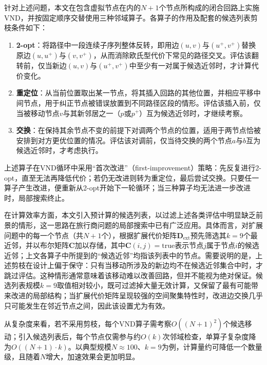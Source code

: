 \documentclass[lettersize,journal]{IEEEtran}
\begin{document}
针对上述问题，本文在包含虚拟节点在内的$N+1$个节点所构成的闭合回路上实施VND，并按固定顺序交替使用三种邻域算子。各算子的作用及配套的候选列表剪枝条件如下：
\begin{enumerate}
\item \textbf{2-opt}：将路径中一段连续子序列整体反转，即用边$(u, v)$与$(u^{+}, v^{+})$替换原边$(u, u^{+})$与$(v, v^{+})$，从而消除欧氏型代价下常见的路径交叉。评估该翻转前，仅当新边$(u, v)$与$(u^{+}, v^{+})$中至少有一对属于候选近邻时，才计算代价变化。
\item \textbf{重定位}：从当前位置取出某一节点，将其插入回路的其他位置，并相应平移中间节点，用于纠正节点被错误放置到不同路径区段的情形。评估该插入前，仅当被移动节点$v$与其新邻居之一（$p$或$p^{+}$）互为候选近邻时，才继续考察。
\item \textbf{交换}：在保持其余节点不变的前提下对调两个节点的位置，适用于两节点恰被安排到对方更优位置的情况。评估该对调前，仅当待交换的两个节点$a$与$b$互为候选近邻时，才考虑执行。
\end{enumerate}
上述算子在VND循环中采用“首次改进”（first-improvement）策略：先反复进行2-opt，直至无法再降低代价；若仍无改进则转为重定位，最后尝试交换。只要任一算子产生改进，便重新从2-opt开始下一轮循环；当三种算子均无法进一步改进时，局部搜索终止。

在计算效率方面，本文引入预计算的候选列表，以过滤上述各类评估中明显缺乏前景的情形，这一思路在旅行商问题的局部搜索中已有广泛应用\cite{ref26}。具体而言，对扩展问题中的每一个节点（共$N+1$个），根据扩展代价矩阵$\mathbf{D}_{\mathrm{ext}}$预先筛选其$k=9$个最近邻，并以布尔矩阵$\mathbf{C}$加以存储，其中$\mathbf{C}(i,j)=\mathrm{true}$表示节点$j$属于节点$i$的候选近邻；上文各算子中所提到的“候选近邻”均指该列表中的节点。需要说明的是，上述剪枝在设计上偏于保守：只有当移动所涉及的新边均不在候选近邻集合中时，才跳过评估。这种情形通常意味着该移动难以改善回路，但并不能视为绝对保证。候选列表规模$k=9$取值相对较小，既可过滤掉大量无效计算，又保留了最有可能带来改进的局部结构；当扩展代价矩阵呈现较强的空间聚集特性时，改进边交换几乎只可能发生在邻近节点之间，因此该设置尤为有效。

从复杂度来看，若不采用剪枝，每个VND算子需考察$O((N+1)^2)$个候选移动；引入候选列表后，每个节点仅需参与约$O(k)$次邻域检查，单算子复杂度降为$O((N+1)\cdot k)$。以典型规模$N\approx 100$、$k=9$为例，计算量约可降低一个数量级，且随着$N$增大，加速效果会更加明显。
\end{document}

